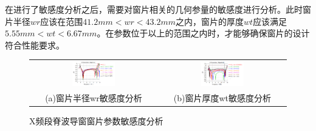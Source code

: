 \documentclass[master]{thesis-uestc}
\begin{document}
在进行了敏感度分析之后，需要对窗片相关的几何参量的敏感度进行分析。此时窗片半径\(wr\)应该在范围\(41.2mm<wr<43.2mm\)之内，窗片的厚度\(wt\)应该满足\(5.55mm<wt<6.67mm\)。在参数位于以上的范围之内时，才能够确保窗片的设计符合性能要求。
\begin{figure}[!htb]
    \small
    \centering
    \begin{tabular}{@{\ }c@{\ }c}
        \includegraphics[width=0.35\textwidth]{pic/chapter3/窗片半径wr扫参.png} & 
        \hspace{5pt}
        \includegraphics[width=0.35\textwidth]{pic/chapter3/窗片厚度wt扫参.png}     \\
        \mbox{\small (a)窗片半径wr敏感度分析}                                                                               & 
        \mbox{\small (b)窗片厚度wt敏感度分析}                                                                                  \\
    \end{tabular}
    \caption{X频段脊波导窗窗片参数敏感度分析}
    \label{fig:X频段脊波导窗窗片参数敏感度分析}
\end{figure}
\end{document}
